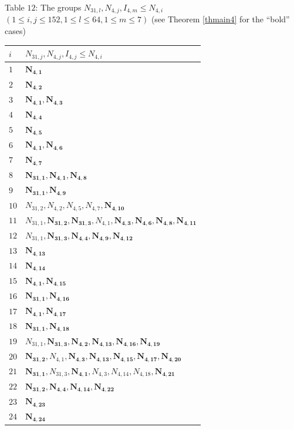 \documentclass{amsart}
\theoremstyle{plain}
\theoremstyle{definition}
\theoremstyle{remark}
\begin{document}
\vspace*{2mm}

Table $12$: The groups $N_{31,l}, N_{4,j}, I_{4,m}\leq N_{4,i}$ 
$(1\leq i,j\leq 152, 1\leq l\leq 64, 1\leq m\leq 7)$ 
(see Theorem \ref{thmain4} for the ``bold'' cases)%
{\small 
\begin{longtable}{ll}
$i$ & $N_{31,j}, N_{4,j}, I_{4,j}\leq N_{4,i}$\\\hline
\endfirsthead
$1$ & $\bm{N_{4,1}}$\\
$2$ & $\bm{N_{4,2}}$\\
$3$ & $\bm{N_{4,1}}, \bm{N_{4,3}}$\\
$4$ & $\bm{N_{4,4}}$\\
$5$ & $\bm{N_{4,5}}$\\
$6$ & $\bm{N_{4,1}}, \bm{N_{4,6}}$\\
$7$ & $\bm{N_{4,7}}$\\
$8$ & $\bm{N_{31,1}}, \bm{N_{4,1}}, \bm{N_{4,8}}$\\
$9$ & $\bm{N_{31,1}}, \bm{N_{4,9}}$\\
$10$ & $N_{31,2}, N_{4,2}, N_{4,5}, N_{4,7}, \bm{N_{4,10}}$\\
$11$ & $N_{31,1}, \bm{N_{31,2}}, \bm{N_{31,3}}, N_{4,1}, \bm{N_{4,3}}, \bm{N_{4,6}}, \bm{N_{4,8}}, \bm{N_{4,11}}$\\
$12$ & $N_{31,1}, \bm{N_{31,3}}, \bm{N_{4,4}}, \bm{N_{4,9}}, \bm{N_{4,12}}$\\
$13$ & $\bm{N_{4,13}}$\\
$14$ & $\bm{N_{4,14}}$\\
$15$ & $\bm{N_{4,1}}, \bm{N_{4,15}}$\\
$16$ & $\bm{N_{31,1}}, \bm{N_{4,16}}$\\
$17$ & $\bm{N_{4,1}}, \bm{N_{4,17}}$\\
$18$ & $\bm{N_{31,1}}, \bm{N_{4,18}}$\\
$19$ & $N_{31,1}, \bm{N_{31,3}}, \bm{N_{4,2}}, \bm{N_{4,13}}, \bm{N_{4,16}}, \bm{N_{4,19}}$\\
$20$ & $\bm{N_{31,2}}, N_{4,1}, \bm{N_{4,3}}, \bm{N_{4,13}}, \bm{N_{4,15}}, \bm{N_{4,17}}, \bm{N_{4,20}}$\\
$21$ & $\bm{N_{31,1}}, N_{31,3}, \bm{N_{4,1}}, N_{4,3}, N_{4,14}, N_{4,18}, \bm{N_{4,21}}$\\
$22$ & $\bm{N_{31,2}}, \bm{N_{4,4}}, \bm{N_{4,14}}, \bm{N_{4,22}}$\\
$23$ & $\bm{N_{4,23}}$\\
$24$ & $\bm{N_{4,24}}$\\

\end{longtable}}
\end{document}
